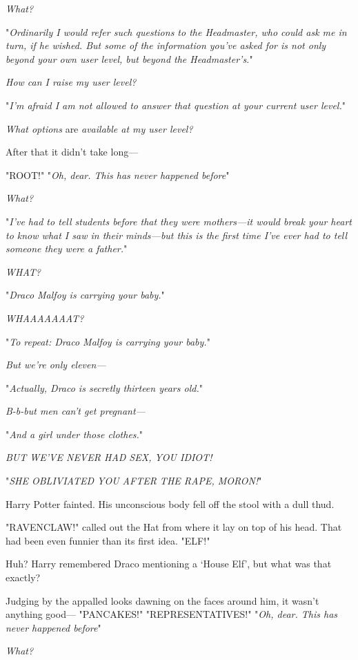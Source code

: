 \emph{What?}

"\emph{Ordinarily I would refer such questions to the Headmaster, who could ask
me in turn, if he wished. But some of the information you've asked for is not
only beyond your own user level, but beyond the Headmaster's.}"

\emph{How can I raise my user level?}

"\emph{I'm afraid I am not allowed to answer that question at your current user
level.}"

\emph{What options} are \emph{available at my user level?}

After that it didn't take long---

"ROOT!"
\sbreak
"\emph{Oh, dear. This has never happened before{\el}}"

\emph{What?}

"\emph{I've had to tell students before that they were mothers---it would break
your heart to know what I saw in their minds---but this is the first time I've
ever had to tell someone they were a father.}"

\emph{WHAT?}

"\emph{Draco Malfoy is carrying your baby.}"

\emph{WHAAAAAAAT?}

"\emph{To repeat: Draco Malfoy is carrying your baby.}"

\emph{But we're only eleven---}

"\emph{Actually, Draco is secretly thirteen years old.}"

\emph{B-b-but men can't get pregnant---}

"\emph{And a girl under those clothes.}"

\emph{BUT WE'VE NEVER HAD SEX, YOU IDIOT!}

"\emph{SHE OBLIVIATED YOU AFTER THE RAPE, MORON!}"

Harry Potter fainted. His unconscious body fell off the stool with a dull thud.

"RAVENCLAW!" called out the Hat from where it lay on top of his head. That had
been even funnier than its first idea.
\sbreak
"ELF!"

Huh? Harry remembered Draco mentioning a `House Elf', but what was that exactly?

Judging by the appalled looks dawning on the faces around him, it wasn't
anything good---
\sbreak
"PANCAKES!"
\sbreak
"REPRESENTATIVES!"
\sbreak
"\emph{Oh, dear. This has never happened before{\el}}"

\emph{What?}

